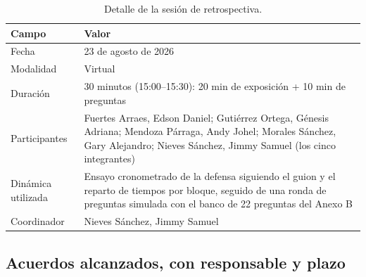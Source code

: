 \documentclass[journal,onecolumn]{IEEEtran}
\begin{document}
	\begin{table}[H]
		\centering
		\caption{Detalle de la sesión de retrospectiva.}
		\label{tab:sesion-retro}
		\small
		\begin{tabularx}{\textwidth}{|L{3.2cm}|X|}
			\hline
			\textbf{Campo} & \textbf{Valor} \\
			\hline
			Fecha & 23 de agosto de 2026 \\
			\hline
			Modalidad & Virtual \\
			\hline
			Duración & 30 minutos (15:00--15:30): 20 min de exposición + 10 min de preguntas \\
			\hline
			Participantes & Fuertes Arraes, Edson Daniel; Gutiérrez Ortega, Génesis Adriana; Mendoza Párraga, Andy Johel; Morales Sánchez, Gary Alejandro; Nieves Sánchez, Jimmy Samuel (los cinco integrantes) \\
			\hline
			Dinámica utilizada & Ensayo cronometrado de la defensa siguiendo el guion y el reparto de tiempos por bloque, seguido de una ronda de preguntas simulada con el banco de 22 preguntas del Anexo B \\
			\hline
			Coordinador & Nieves Sánchez, Jimmy Samuel \\
			\hline
		\end{tabularx}
	\end{table}
	
	
	
	\subsection*{Acuerdos alcanzados, con responsable y plazo}
	
\end{document}
